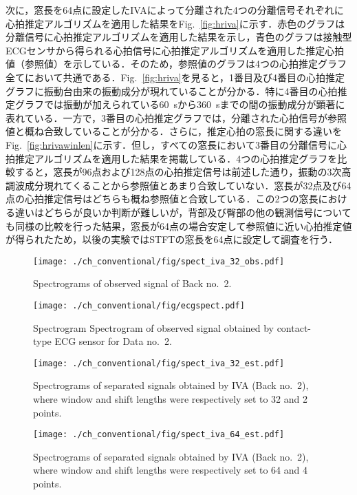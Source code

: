 次に，窓長を64点に設定したIVAによって分離された4つの分離信号それぞれに心拍推定アルゴリズムを適用した結果をFig.~\ref{fig:hriva}に示す．赤色のグラフは分離信号に心拍推定アルゴリズムを適用した結果を示し，青色のグラフは接触型ECGセンサから得られる心拍信号に心拍推定アルゴリズムを適用した推定心拍値（参照値）を示している．そのため，参照値のグラフは4つの心拍推定グラフ全てにおいて共通である．Fig.~\ref{fig:hriva}を見ると，1番目及び4番目の心拍推定グラフに振動台由来の振動成分が現れていることが分かる．特に4番目の心拍推定グラフでは振動が加えられている60~sから360~sまでの間の振動成分が顕著に表れている．一方で，3番目の心拍推定グラフでは，分離された心拍信号が参照値と概ね合致していることが分かる．さらに，推定心拍の窓長に関する違いをFig.~\ref{fig:hrivawinlen}に示す．但し，すべての窓長において3番目の分離信号に心拍推定アルゴリズムを適用した結果を掲載している．4つの心拍推定グラフを比較すると，窓長が96点および128点の心拍推定信号は前述した通り，振動の3次高調波成分現れてくることから参照値とあまり合致していない．窓長が32点及び64点の心拍推定信号はどちらも概ね参照値と合致している．この2つの窓長における違いはどちらが良いか判断が難しいが，背部及び臀部の他の観測信号についても同様の比較を行った結果，窓長が64点の場合安定して参照値に近い心拍推定値が得られたため，以後の実験ではSTFTの窓長を64点に設定して調査を行う．


\begin{figure}[tb]
\centering
\texttt{[image: ./ch\_conventional/fig/spect\_iva\_32\_obs.pdf]}
\caption{Spectrograms of observed signal of Back no.~2.}
\label{fig:siva32obs}
\end{figure}

\begin{figure}[tb]
\centering
\texttt{[image: ./ch\_conventional/fig/ecgspect.pdf]}
\caption{Spectrogram Spectrogram of observed signal obtained by contact-type ECG sensor for Data no.~2.}
\label{fig:ecgspect}
\end{figure}

\begin{figure}[tb]
\centering
\texttt{[image: ./ch\_conventional/fig/spect\_iva\_32\_est.pdf]}
\caption{Spectrograms of separated signals obtained by IVA (Back no.~2), where window and shift lengths were respectively set to 32 and 2 points.}
\label{fig:siva32est}
\end{figure}

\begin{figure}[tb]
\centering
\texttt{[image: ./ch\_conventional/fig/spect\_iva\_64\_est.pdf]}
\caption{Spectrograms of separated signals obtained by IVA (Back no.~2), where window and shift lengths were respectively set to 64 and 4 points.}
\label{fig:siva64est}
\end{figure}

